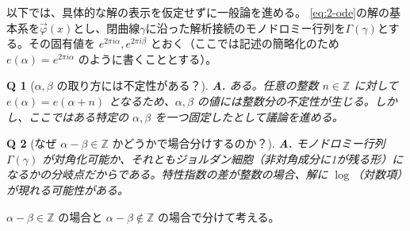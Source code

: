 \documentclass[paper=a4, fontsize=11pt]{jlreq} %
\theoremstyle{break}
\theoremstyle{qa}
\newtheorem*{Q}{Q}
\theoremstyle{remark} %
\begin{document}
以下では、具体的な解の表示を仮定せずに一般論を進める。
\eqref{eq:2-ode}の解の基本系を$\vec{\varphi}(x)$とし、閉曲線$\gamma$に沿った解析接続のモノドロミー行列を$\Gamma(\gamma)$とする。その固有値を $e^{2\pi i \alpha}, e^{2\pi i \beta}$ とおく（ここでは記述の簡略化のため $e(\alpha)=e^{2\pi i \alpha}$ のように書くこととする）。

\begin{Q}[$\alpha, \beta$ の取り方には不定性がある？]
\textbf{A.} ある。任意の整数 $n \in \mathbb{Z}$ に対して $e(\alpha) = e(\alpha+n)$ となるため、$\alpha, \beta$ の値には整数分の不定性が生じる。しかし、ここではある特定の $\alpha, \beta$ を一つ固定したとして議論を進める。
\end{Q}

\begin{Q}[なぜ $\alpha-\beta \in \mathbb{Z}$ かどうかで場合分けするのか？]
\textbf{A.} モノドロミー行列 $\Gamma(\gamma)$ が対角化可能か、それともジョルダン細胞（非対角成分に1が残る形）になるかの分岐点だからである。特性指数の差が整数の場合、解に $\log$（対数項）が現れる可能性がある。
\end{Q}

$\alpha-\beta \in \mathbb{Z}$ の場合と $\alpha-\beta \not\in \mathbb{Z}$ の場合で分けて考える。
\end{document}
